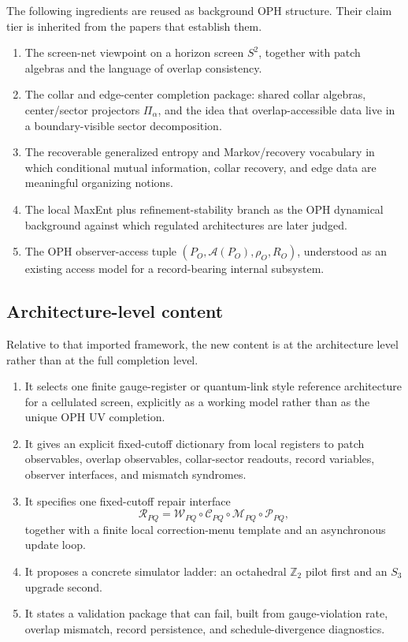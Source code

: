 \documentclass[11pt]{article}
\begin{document}
The following ingredients are reused as background OPH structure. Their claim tier is inherited from the papers that establish them.
\begin{enumerate}[leftmargin=2em]
\item The screen-net viewpoint on a horizon screen $S^2$, together with patch algebras and the
language of overlap consistency.
\item The collar and edge-center completion package: shared collar algebras, center/sector
projectors $\Pi_{\alpha}$, and the idea that overlap-accessible data live in a boundary-visible
sector decomposition.
\item The recoverable generalized entropy and Markov/recovery vocabulary in which conditional
mutual information, collar recovery, and edge data are meaningful organizing notions.
\item The local MaxEnt plus refinement-stability branch as the OPH dynamical background
against which regulated architectures are later judged.
\item The OPH observer-access tuple $(P_O,\mathcal A(P_O),\rho_O,R_O)$, understood as an
existing access model for a record-bearing internal subsystem.
\end{enumerate}

\subsection{Architecture-level content}

Relative to that imported framework, the new content is at the architecture level rather than at the full completion level.
\begin{enumerate}[leftmargin=2em]
\item It selects one finite gauge-register or quantum-link style reference architecture for a
cellulated screen, explicitly as a working model rather than as the unique OPH UV completion.
\item It gives an explicit fixed-cutoff dictionary from local registers to patch observables,
overlap observables, collar-sector readouts, record variables, observer interfaces, and mismatch
syndromes.
\item It specifies one fixed-cutoff repair interface
\begin{equation}
\mathcal R_{PQ}=\mathcal W_{PQ}\circ \mathcal C_{PQ}\circ \mathcal M_{PQ}\circ \mathcal P_{PQ},
\end{equation}
together with a finite local correction-menu template and an asynchronous update loop.
\item It proposes a concrete simulator ladder: an octahedral $\mathbb Z_2$ pilot first and an
$S_3$ upgrade second.
\item It states a validation package that can fail, built from gauge-violation rate, overlap
mismatch, record persistence, and schedule-divergence diagnostics.
\end{enumerate}
\end{document}
